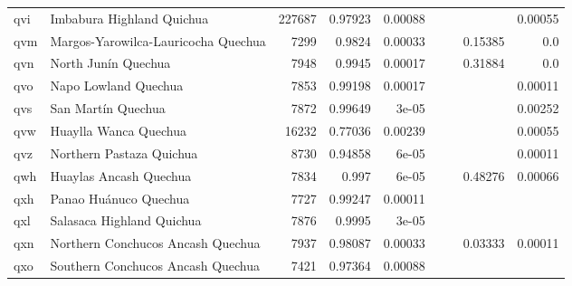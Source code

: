 \documentclass[11pt]{article}
\begin{document}
\begin{table*}[h]
{\begin{tabular}{llrrrrrrr}
qvi         & Imbabura Highland Quichua         & 227687         & 0.97923         & 0.00088         &          &          &          & 0.00055         \\

qvm         & Margos-Yarowilca-Lauricocha Quechua         & 7299         & 0.9824         & 0.00033         &          &          & 0.15385         & 0.0         \\

qvn         & North Junín Quechua         & 7948         & 0.9945         & 0.00017         &          &          & 0.31884         & 0.0         \\

qvo         & Napo Lowland Quechua         & 7853         & 0.99198         & 0.00017         &          &          &          & 0.00011         \\

qvs         & San Martín Quechua         & 7872         & 0.99649         & 3e-05         &          &          &          & 0.00252         \\

qvw         & Huaylla Wanca Quechua         & 16232         & 0.77036         & 0.00239         &          &          &          & 0.00055         \\

qvz         & Northern Pastaza Quichua         & 8730         & 0.94858         & 6e-05         &          &          &          & 0.00011         \\

qwh         & Huaylas Ancash Quechua         & 7834         & 0.997         & 6e-05         &          &          & 0.48276         & 0.00066         \\

qxh         & Panao Huánuco Quechua         & 7727         & 0.99247         & 0.00011         &          &          &          &          \\

qxl         & Salasaca Highland Quichua         & 7876         & 0.9995         & 3e-05         &          &          &          &          \\

qxn         & Northern Conchucos Ancash Quechua         & 7937         & 0.98087         & 0.00033         &          &          & 0.03333         & 0.00011         \\

qxo         & Southern Conchucos Ancash Quechua         & 7421         & 0.97364         & 0.00088         &          &          &          &          \\


\end{tabular}}
\end{table*}
\end{document}
